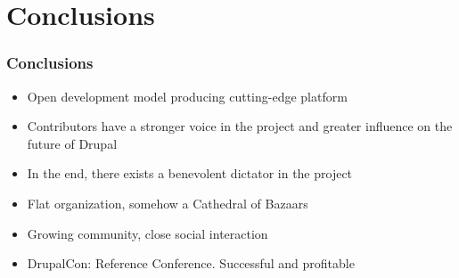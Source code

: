 \section{Conclusions}
\begin{frame}[allowframebreaks]
\frametitle{Conclusions}

\begin{itemize}
	\item Open development model producing cutting-edge platform
	\item Contributors have a stronger voice in the project and greater influence on the future of Drupal
	\item In the end, there exists a benevolent dictator in the project
	\item Flat organization, somehow a Cathedral of Bazaars
	\item Growing community, close social interaction
	\item DrupalCon: Reference Conference. Successful and profitable
\end{itemize}

\end{frame}

